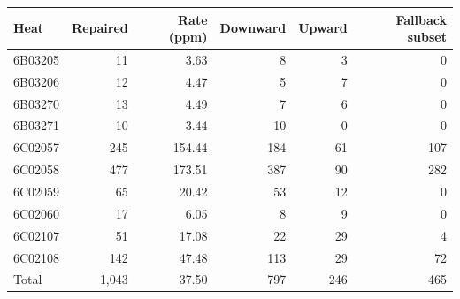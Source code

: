 \begingroup
{}
\begin{tabular}{lrrrrr}
\toprule
Heat & Repaired & Rate (ppm) & Downward & Upward & Fallback subset \\
\midrule
6B03205 & 11 & 3.63 & 8 & 3 & 0 \\
6B03206 & 12 & 4.47 & 5 & 7 & 0 \\
6B03270 & 13 & 4.49 & 7 & 6 & 0 \\
6B03271 & 10 & 3.44 & 10 & 0 & 0 \\
6C02057 & 245 & 154.44 & 184 & 61 & 107 \\
6C02058 & 477 & 173.51 & 387 & 90 & 282 \\
6C02059 & 65 & 20.42 & 53 & 12 & 0 \\
6C02060 & 17 & 6.05 & 8 & 9 & 0 \\
6C02107 & 51 & 17.08 & 22 & 29 & 4 \\
6C02108 & 142 & 47.48 & 113 & 29 & 72 \\
Total & 1,043 & 37.50 & 797 & 246 & 465 \\
\bottomrule
\end{tabular}
\endgroup
